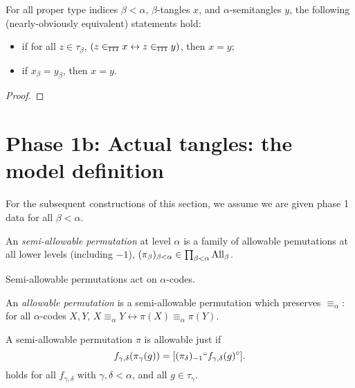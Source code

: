 \begin{theorem}
\label {thm:extensionality}
\leanok
For all proper type indices $\beta < \alpha$, $\beta$-tangles $x$, and $\alpha$-semitangles $y$, the following (nearly-obviously equivalent) statements hold:
\begin{itemize}
  \item if for all $z \in \tau_\beta$, $(z \in_{\tt TTT} x \leftrightarrow z \in_{\tt TTT} y)$, then $x=y$;
  \item if $x_\beta = y_\beta$, then $x=y$.
\end{itemize}
\end{theorem}
\begin{proof}\leanok\end{proof}

\section{Phase 1b: Actual tangles: the model definition}

  For the subsequent constructions of this section, we assume we are given phase 1 data for all $\beta < \alpha$.

\begin{definition}
\label {def:semiallowable-perm}
\leanok
{}
  An \emph{semi-allowable permutation} at level $\alpha$ is a family of allowable pemutations at all lower levels (including $-1$), $(\pi_\beta)_{\beta < \alpha} \in \prod_{\beta < \alpha} \mathrm{All}_\beta$.
\end{definition}

\begin{definition}
\label{def:code-action}
\leanok
Semi-allowable permutations act on $\alpha$-codes.
\end{definition}

\begin{definition}
  \label{def:allowable-perm}
  \leanok
  An \emph{allowable permutation} is a semi-allowable permutation which preserves $\equiv_\alpha$: for all $\alpha$-codes $X,Y$, $X \equiv_\alpha Y \leftrightarrow \pi(X) \equiv_\alpha \pi(Y)$.
\end{definition}

\begin{lemma}
\label {lem:coherence-unpacked}
\leanok
A semi-allowable permutation $\pi$ is allowable just if
$$f_{\gamma,\delta}(\pi_\gamma(g)) = [(\pi_\delta)_{-1}``f_{\gamma,\delta}(g)^\circ].$$
holds for all $f_{\gamma,\delta}$ with $\gamma,\delta<\alpha$, and all $g \in \tau_\gamma$.
\end{lemma}

